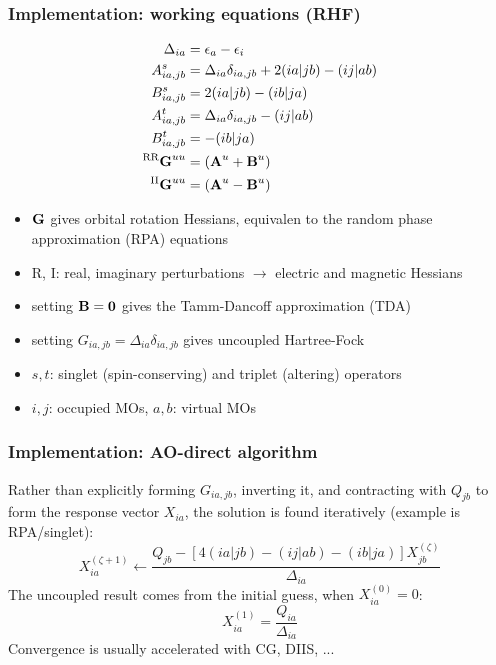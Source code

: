 \documentclass[%
    xcolor=usenames,dvipsnames,svgnames%
]{beamer}
\begin{document}
\begin{frame}
  \frametitle{Implementation: working equations (RHF)}
  \begin{align*}
    \Delta_{ia} &= \epsilon_{a} - \epsilon_{i} \\
    A_{ia,jb}^{s} &= \Delta_{ia}\delta_{ia,jb} + 2(ia|jb) - (ij|ab) \\
    B_{ia,jb}^{s} &= 2(ia|jb) - (ib|ja) \\
    A_{ia,jb}^{t} &= \Delta_{ia}\delta_{ia,jb} - (ij|ab) \\
    B_{ia,jb}^{t} &= - (ib|ja) \\
    ^{\text{RR}}\boldsymbol{\mathbf{G}}^{uu} &= (\boldsymbol{\mathbf{A}}^{u} + \boldsymbol{\mathbf{B}}^{u}) \\
    ^{\text{II}}\boldsymbol{\mathbf{G}}^{uu} &= (\boldsymbol{\mathbf{A}}^{u} - \boldsymbol{\mathbf{B}}^{u})
  \end{align*}
  \scriptsize
  \begin{itemize}
  \item \(\boldsymbol{\mathbf{G}}\) gives orbital rotation Hessians, equivalen to the random phase approximation (RPA) equations \\
  \item R, I: real, imaginary perturbations \(\rightarrow\) electric and magnetic Hessians \\
  \item setting \(\boldsymbol{\mathbf{B}} = \boldsymbol{\mathbf{0}}\) gives the Tamm-Dancoff approximation (TDA) \\
  \item setting \( G_{ia,jb} = \Delta_{ia}\delta_{ia,jb} \) gives uncoupled Hartree-Fock \\
  \item \(s,t\): singlet (spin-conserving) and triplet (altering) operators \\
  \item \(i,j\): occupied MOs, \(a,b\): virtual MOs
  \end{itemize}
\end{frame}

\begin{frame}
  \frametitle{Implementation: AO-direct algorithm}
  Rather than explicitly forming \(G_{ia,jb}\), inverting it, and contracting with \(Q_{jb}\) to form the response vector \(X_{ia}\), the solution is found iteratively (example is RPA/singlet):
  \begin{equation*}
    X_{ia}^{(\zeta+1)} \leftarrow \frac{Q_{jb} - \left[4(ia|jb) - (ij|ab) - (ib|ja)\right] X_{jb}^{(\zeta)}}{\Delta_{ia}}
  \end{equation*}
  The uncoupled result comes from the initial guess, when \(X_{ia}^{(0)} = 0\):
  \begin{equation*}
    X_{ia}^{(1)} = \frac{Q_{ia}}{\Delta_{ia}}
  \end{equation*}
  Convergence is usually accelerated with CG, DIIS, ...
\end{frame}
\end{document}
